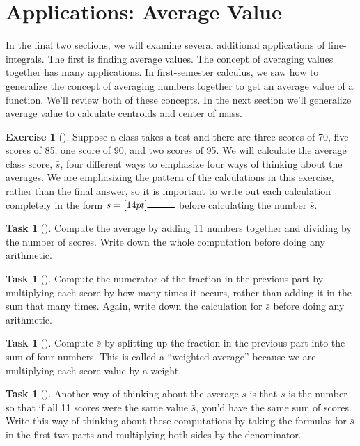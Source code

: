 \documentclass[10pt,]{book}
\theoremstyle{plain}
\theoremstyle{definition}
\theoremstyle{definition}
\theoremstyle{definition}
\theoremstyle{definition}
\newtheorem{exploration}[project]{Exercise}
\newtheorem{task}[project]{Task}
\theoremstyle{definition}
\numberwithin{equation}{section}
\newcommand{\blank}[1]{[14pt]{\rule{#1}{1pt}}}
\begin{document}
\section[{Applications: Average Value}]{Applications: Average Value}\label{section-32}
In the final two sections, we will examine several additional applications of line-integrals. The first is finding average values. The concept of averaging values together has many applications. In first-semester calculus, we saw how to generalize the concept of averaging numbers together to get an average value of a function. We'll review both of these concepts. In the next section we'll generalize average value to calculate centroids and center of mass.%
\begin{exploration}[]\label{average_value_methods}
Suppose a class takes a test and there are three scores of 70, five scores of 85, one score of 90, and two scores of 95. We will calculate the average class score, \(\bar s\), four different ways to emphasize four ways of thinking about the averages. We are emphasizing the pattern of the calculations in this exercise, rather than the final answer, so it is important to write out each calculation completely in the form \(\bar s = \blank{1cm}\) before calculating the number \(\bar s\).%
\begin{task}[]\label{task-539}
Compute the average by adding 11 numbers together and dividing by the number of scores.  Write down the whole computation before doing any arithmetic.%
\end{task}
\begin{task}[]\label{task-540}
Compute the numerator of the fraction in the previous part by multiplying each score by how many times it occurs, rather than adding it in the sum that many times.  Again, write down the calculation for \(\bar s\) before doing any arithmetic.%
\end{task}
\begin{task}[]\label{task-541}
Compute \(\bar s\) by splitting up the fraction in the previous part into the sum of four numbers.  This is called a ``weighted average'' because we are multiplying each score value by a weight.%
\end{task}
\begin{task}[]\label{task-542}
Another way of thinking about the average \(\bar s\) is that \(\bar s\) is the number so that if all 11 scores were the same value \(\bar s\), you'd have the same sum of scores.  Write this way of thinking about these computations by taking the formulas for \(\bar s\) in the first two parts and multiplying both sides by the denominator.%
\end{task}
\end{exploration}
\end{document}
